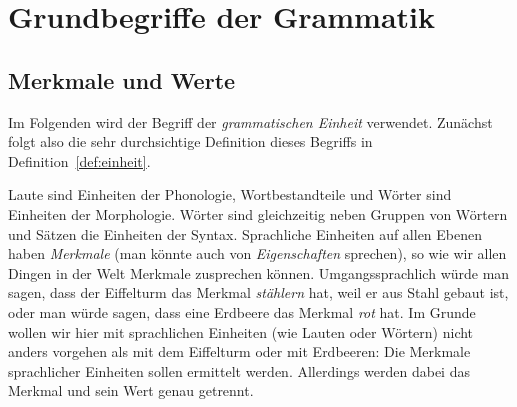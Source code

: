 \chapter{Grundbegriffe der Grammatik}

\label{sec:grundbegriffe}

\section{Merkmale und Werte}

\label{sec:merkmaleundwerte}

Im Folgenden wird der Begriff der \textit{grammatischen Einheit} verwendet.
Zunächst folgt also die sehr durchsichtige Definition dieses Begriffs in Definition~\ref{def:einheit}.



Laute sind Einheiten der Phonologie, Wortbestandteile und Wörter sind Einheiten der Morphologie.
Wörter sind gleichzeitig neben Gruppen von Wörtern und Sätzen die Einheiten der Syntax.
Sprachliche Einheiten auf allen Ebenen haben \textit{Merkmale} (man könnte auch von \textit{Eigenschaften} sprechen), so wie wir allen Dingen in der Welt Merkmale zusprechen können.
Umgangssprachlich würde man sagen, dass der Eiffelturm das Merkmal \textit{stählern} hat, weil er aus Stahl gebaut ist, oder man würde sagen, dass eine Erdbeere das Merkmal \textit{rot} hat.
Im Grunde wollen wir hier mit sprachlichen Einheiten (wie Lauten oder Wörtern) nicht anders vorgehen als mit dem Eiffelturm oder mit Erdbeeren:
Die Merkmale sprachlicher Einheiten sollen ermittelt werden.
Allerdings werden dabei das Merkmal und sein Wert genau getrennt.


